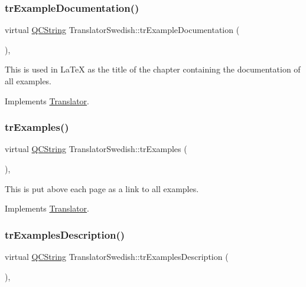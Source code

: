 \subsubsection{\texorpdfstring{trExampleDocumentation()}{trExampleDocumentation()}}
{\footnotesize\ttfamily virtual \mbox{\hyperlink{class_q_c_string}{Q\+C\+String}} Translator\+Swedish\+::tr\+Example\+Documentation (\begin{DoxyParamCaption}{ }\end{DoxyParamCaption})\hspace{0.3cm}{\ttfamily [inline]}, {\ttfamily [virtual]}}

This is used in La\+TeX as the title of the chapter containing the documentation of all examples. 

Implements \mbox{\hyperlink{class_translator}{Translator}}.

\mbox{\label{class_translator_swedish_a5c6afebd5e435862e3addc2dac4890ca}} 
\subsubsection{\texorpdfstring{trExamples()}{trExamples()}}
{\footnotesize\ttfamily virtual \mbox{\hyperlink{class_q_c_string}{Q\+C\+String}} Translator\+Swedish\+::tr\+Examples (\begin{DoxyParamCaption}{ }\end{DoxyParamCaption})\hspace{0.3cm}{\ttfamily [inline]}, {\ttfamily [virtual]}}

This is put above each page as a link to all examples. 

Implements \mbox{\hyperlink{class_translator}{Translator}}.

\mbox{\label{class_translator_swedish_aca89aec9e93e2fb4774a7731a1257022}} 
\subsubsection{\texorpdfstring{trExamplesDescription()}{trExamplesDescription()}}
{\footnotesize\ttfamily virtual \mbox{\hyperlink{class_q_c_string}{Q\+C\+String}} Translator\+Swedish\+::tr\+Examples\+Description (\begin{DoxyParamCaption}{ }\end{DoxyParamCaption})\hspace{0.3cm}{\ttfamily [inline]}, {\ttfamily [virtual]}}

